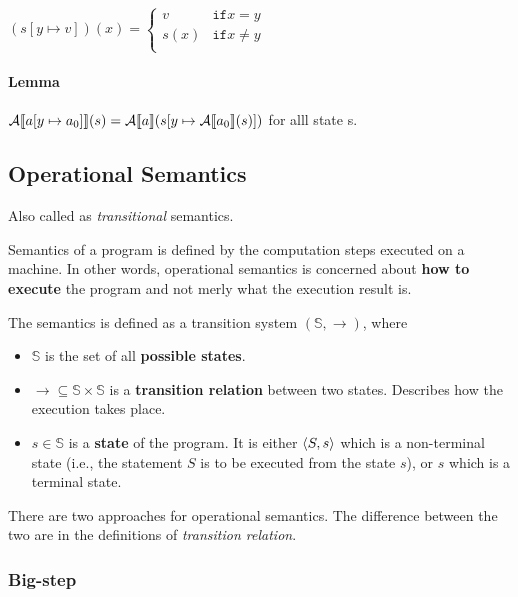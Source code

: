 \begin{math}
  (s[y \mapsto v])(x) =
  \begin{cases}
    v & \mathtt{if} x = y \\
    s(x) & \mathtt{if} x \neq y \\
  \end{cases}
\end{math}



\paragraph{Lemma}
$\mathcal{A} \llbracket  a[y \mapsto a_0]  \rrbracket (s) = \mathcal{A} \llbracket a \rrbracket (s [ y
\mapsto \mathcal{A} \llbracket a_0 \rrbracket (s)]) $ for alll state s.



\subsection{Operational Semantics}

Also called as \textit{transitional} semantics.

Semantics of a program is defined by the computation steps executed on
a machine. In other words, operational semantics is concerned about
\textbf{how to execute} the program and not merly what the execution
result is.

The semantics is defined as a transition system
$ ( \mathbb{S}, \to ) $, where

\begin{itemize}
\item $ \mathbb{S} $ is the set of all \textbf{possible states}.
\item $ \to \subseteq \mathbb{S} \times \mathbb{S} $ is a
  \textbf{transition relation} between two states. Describes how the
  execution takes place.
\item $ s \in \mathbb{S} $ is a \textbf{state} of the program. It is
  either $ \langle  S, s  \rangle$ which is a non-terminal state (i.e., the
  statement $ S $ is to be executed from the state $ s $), or $ s $
  which is a terminal state.
\end{itemize}

There are two approaches for operational semantics.  The difference
between the two are in the definitions of \textsl{transition
  relation}.

\subsubsection{Big-step}
\label{sec:big-step}

